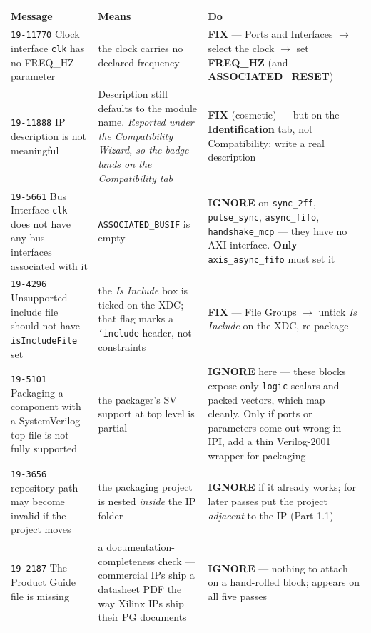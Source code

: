 \documentclass[10pt,a4paper]{article}
\newcommand{\code}[1]{\texttt{\small #1}}
\begin{document}
\begin{center}
\small
\begin{tabular}{@{}p{4.3cm}p{5.0cm}p{5.2cm}@{}}
\toprule
\textbf{Message} & \textbf{Means} & \textbf{Do} \\
\midrule
\code{19-11770} Clock interface \code{clk} has no FREQ\_HZ parameter &
the clock carries no declared frequency &
\textbf{FIX} --- Ports and Interfaces $\to$ select the clock $\to$ set
\textbf{FREQ\_HZ} (and \textbf{ASSOCIATED\_RESET}) \\
\addlinespace
\code{19-11888} IP description is not meaningful &
Description still defaults to the module name. \emph{Reported under the
Compatibility Wizard, so the badge lands on the Compatibility tab} &
\textbf{FIX} (cosmetic) --- but on the \textbf{Identification} tab, not
Compatibility: write a real description \\
\addlinespace
\code{19-5661} Bus Interface \code{clk} does not have any bus interfaces
associated with it &
\code{ASSOCIATED\_BUSIF} is empty &
\textbf{IGNORE} on \code{sync\_2ff}, \code{pulse\_sync}, \code{async\_fifo},
\code{handshake\_mcp} --- they have no AXI interface. \textbf{Only}
\code{axis\_async\_fifo} must set it \\
\addlinespace
\code{19-4296} Unsupported include file should not have \code{isIncludeFile} set &
the \emph{Is Include} box is ticked on the XDC; that flag marks a
\code{`include} header, not constraints &
\textbf{FIX} --- File Groups $\to$ untick \emph{Is Include} on the XDC, re-package \\
\addlinespace
\code{19-5101} Packaging a component with a SystemVerilog top file is not fully
supported &
the packager's SV support at top level is partial &
\textbf{IGNORE} here --- these blocks expose only \code{logic} scalars and packed
vectors, which map cleanly. Only if ports or parameters come out wrong in IPI, add a
thin Verilog-2001 wrapper for packaging \\
\addlinespace
\code{19-3656} repository path may become invalid if the project moves &
the packaging project is nested \emph{inside} the IP folder &
\textbf{IGNORE} if it already works; for later passes put the project
\emph{adjacent} to the IP (Part 1.1) \\
\addlinespace
\code{19-2187} The Product Guide file is missing &
a documentation-completeness check --- commercial IPs ship a datasheet PDF the way
Xilinx IPs ship their PG documents &
\textbf{IGNORE} --- nothing to attach on a hand-rolled block; appears on all five
passes \\
\bottomrule
\end{tabular}
\end{center}
\end{document}
